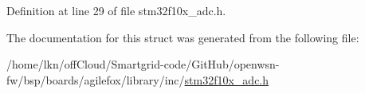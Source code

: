 Definition at line 29 of file stm32f10x\+\_\+adc.\+h.



The documentation for this struct was generated from the following file\+:\begin{DoxyCompactItemize}
\item 
/home/lkn/off\+Cloud/\+Smartgrid-\/code/\+Git\+Hub/openwsn-\/fw/bsp/boards/agilefox/library/inc/\hyperlink{agilefox_2library_2inc_2stm32f10x__adc_8h}{stm32f10x\+\_\+adc.\+h}\end{DoxyCompactItemize}
